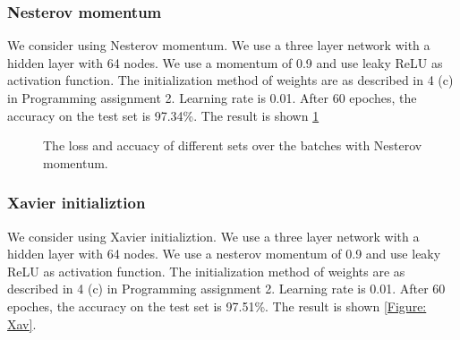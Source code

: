 \documentclass{article} %
\begin{document}
\subsubsection{Nesterov momentum}
We consider using Nesterov momentum. We use a three layer network with a hidden layer with 64 nodes. We use a momentum of 0.9 and use leaky ReLU as activation function. The initialization method of weights are as described in 4 (c) in Programming assignment 2. Learning rate is 0.01. After 60 epoches, the accuracy on the test set is 97.34\%. The result is shown \ref{Figure: nes}

\begin{figure} [!htbp]
	
	\caption{The loss and accuacy of different sets over the batches with Nesterov momentum. } 
	\label{Figure: nes} 
	
\end{figure}


\subsubsection{Xavier initializtion}
We consider using Xavier initializtion. We use a three layer network with a hidden layer with 64 nodes. We use a nesterov momentum of 0.9 and use leaky ReLU as activation function. The initialization method of weights are as described in 4 (c) in Programming assignment 2. Learning rate is 0.01. After 60 epoches, the accuracy on the test set is 97.51\%. The result is shown \ref{Figure: Xav}.
\end{document}
